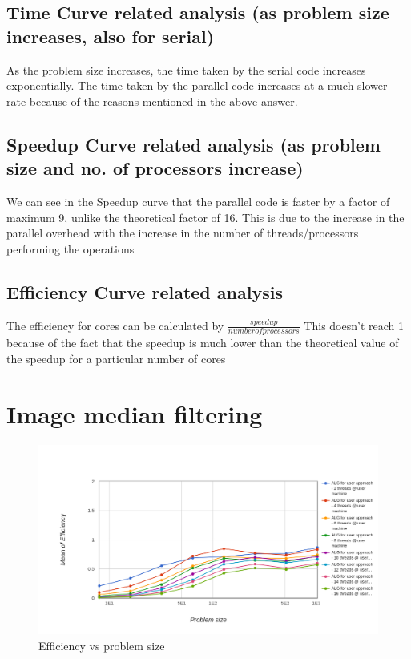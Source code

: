 \documentclass[runningheads, a4paper, oribibl]{llncs}
\begin{document}
\subsection{Time Curve related analysis (as problem size increases, also for serial)}
As the problem size increases, the time taken by the serial code increases exponentially. The time taken by the parallel code increases at a much slower rate because of the reasons mentioned in the above answer.

\subsection{Speedup Curve related analysis (as problem size and no. of processors increase)}
We can see in the Speedup curve that the parallel  code is faster by a factor of maximum 9, unlike the theoretical factor of 16. This is due to the increase in the parallel overhead with the increase in the number of threads/processors performing the operations

\subsection{Efficiency Curve related analysis}
The efficiency for cores can be calculated by $\frac{speedup}{number of processors}$ This doesn't reach 1 because of the fact that the speedup is much lower than the theoretical value of the speedup for a particular number of cores

\section{Image median filtering}
\begin{figure}[h!]
    \centering
    \includegraphics[scale = 0.3]{q2/mean_efficiency.png}
    \caption{Efficiency vs problem size}
    \label{fig:q2_eff}
\end{figure}
\end{document}
